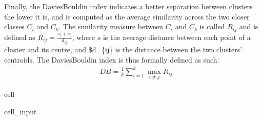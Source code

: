 \documentclass[letterpaper,10pt,english]{jupyterBook}
\begin{document}
\sphinxAtStartPar
Finally, the Davies\sphinxhyphen{}Bouldin index indicates a better separation between clusters the lower it is, and is computed as the average similarity across the two closer classes \(C_i\) and \(C_k\). The similarity measure between \(C_i\) and \(C_k\) is called \(R_{ij}\) and is defined as \(R_{ij} = \frac{s_i + s_j}{d_{ij}}\), where \(s\) is the average distance between each point of a cluster and its centre, and \$d\_\{ij\} is the distance between the two clusters’ centroids. The Davies\sphinxhyphen{}Bouldin index is thus formally defined as such:
\label{equation:04-stations_kmeans:462ce06e-60f7-4af3-a1f9-1b96040372bf}\begin{align}
& DB = \frac{1}{k} \sum_{i=1}^k \max_{i \neq j} R_{ij}
\end{align}
\begin{sphinxuseclass}{cell}
\begin{sphinxuseclass}{cell_input}
\begin{sphinxVerbatim}[commandchars=\\\{\}]
     
   
   
   


     
       
          \PYG{p}{[} \PYG{p}{]}
     


   
\end{sphinxVerbatim}

\end{sphinxuseclass}
\end{sphinxuseclass}
\end{document}
